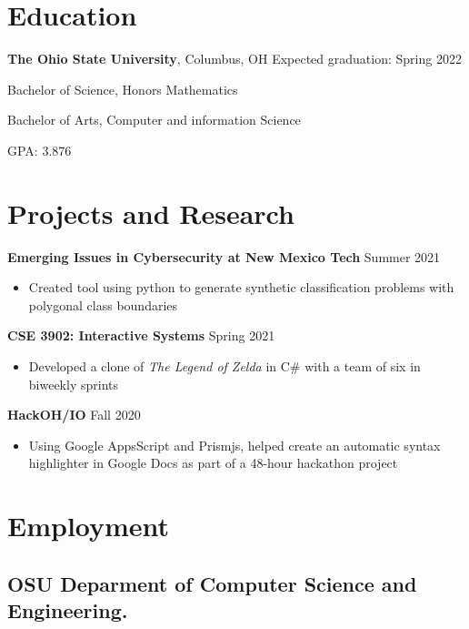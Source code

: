\documentclass[10pt,sans]{moderncv}
\begin{document}
\maketitle

\section*{Education}

\textbf{The Ohio State University}, Columbus, OH \hfill Expected graduation: Spring 2022

Bachelor of Science, Honors Mathematics

Bachelor of Arts, Computer and information Science

GPA: 3.876

\section*{Projects and Research}

\textbf{Emerging Issues in Cybersecurity at New Mexico Tech} \hfill Summer 2021
\begin{itemize}
    \item Created tool using python to generate synthetic classification problems with polygonal class boundaries
\end{itemize}

\textbf{CSE 3902: Interactive Systems} \hfill Spring 2021
\begin{itemize}
    \item Developed a clone of \textit{The Legend of Zelda} in C\# with a team of six in biweekly sprints
\end{itemize}

\textbf{HackOH/IO} \hfill Fall 2020
\begin{itemize}
    \item Using Google AppsScript and Prismjs, helped create an automatic syntax highlighter in Google Docs as part of a
    48-hour hackathon project
\end{itemize}

\section*{Employment}

\subsection*{OSU Deparment of Computer Science and Engineering.}
\end{document}
